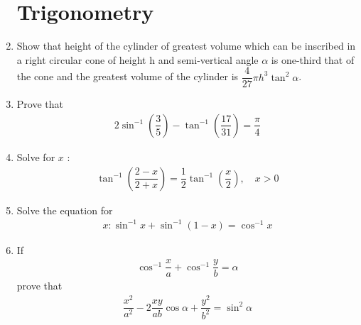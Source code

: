 \documentclass[12pt,-letter paper]{article}
\theoremstyle{remark}
\providecommand{\brak}[1]{\ensuremath{\left(#1\right)}}
\begin{document}
\begin{enumerate}
            \section{Trigonometry}
      \item Show that height of the cylinder of greatest volume which can be inscribed in a right circular cone of height h and semi-vertical angle $\alpha$ is one-third that of the cone and the greatest volume of the cylinder is $\dfrac{4}{27} \pi h^3 \tan^2 \alpha$.
      \item Prove that
            \begin{align*}
                  2\sin^{-1}\brak{\dfrac{3}{5}}-\tan^{-1}\brak{\dfrac{17}{31}}=\dfrac{\pi}{4}
            \end{align*}
      \item Solve for $x$ :
            \begin{align*}
                  \tan^{-1}\brak{\dfrac{2-x}{2+x}}=\dfrac{1}{2} \tan^{-1}\brak{\dfrac{x}{2}},\quad x>0
            \end{align*}

      \item Solve the equation for
            \begin{align*}
                  x: \sin^{-1} x + \sin^{-1}\brak{1-x} = \cos^{-1}x
            \end{align*}
      \item If
            \begin{align*}
                  \cos^{-1}\dfrac{x}{a} + \cos^{-1}\dfrac{y}{b} = \alpha
            \end{align*}
            prove that
            \begin{align*}
                  \dfrac{x^2}{a^2} -2\dfrac{xy}{ab}\cos \alpha + \dfrac{y^2}{b^2} = \sin^2 \alpha
            \end{align*}

\end{enumerate}
\end{document}
